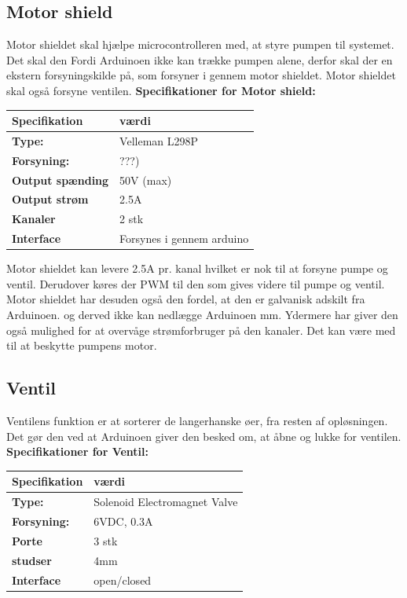 \subsection{Motor shield}
Motor shieldet skal hjælpe microcontrolleren med, at styre pumpen til systemet. Det skal den Fordi Arduinoen ikke kan trække pumpen alene, derfor skal der en ekstern forsyningskilde på, som forsyner i gennem motor shieldet. Motor shieldet skal også forsyne ventilen. 
 \textbf{Specifikationer for Motor shield:} 
\begin{center}
		\begin{longtable}{ | m{6.5cm} | m{6.5cm}| } 
			\hline
			\textbf{Specifikation} &\textbf{værdi} \\ 
			\hline
			\textbf{Type:} & Velleman L298P \\ 
			\hline
			\textbf{Forsyning:} & ???)  \\ 
			\hline
			\textbf{Output spænding} & 50V (max)  \\ 
			\hline		
			\textbf{Output strøm} & 2.5A  \\ 
			\hline	
			\textbf{Kanaler} & 2 stk  \\ 
			\hline	
			\textbf{Interface} & Forsynes i gennem arduino  \\ 
			\hline	
		\end{longtable}
\end{center}
Motor shieldet kan levere 2.5A pr. kanal hvilket er nok til at forsyne pumpe og ventil. Derudover køres der PWM til den som gives videre til pumpe og ventil. Motor shieldet har desuden også den fordel, at den er galvanisk adskilt fra Arduinoen. og derved ikke kan nedlægge Arduinoen mm. Ydermere har giver den også mulighed for at overvåge strømforbruger på den kanaler. Det kan være med til at beskytte pumpens motor.


\subsection{Ventil}
Ventilens funktion er at sorterer de langerhanske øer, fra resten af opløsningen. Det gør den ved at Arduinoen giver den besked om, at åbne og lukke for ventilen.
\textbf{Specifikationer for Ventil:} 
\begin{center}
		\begin{longtable}{ | m{6.5cm} | m{6.5cm}| } 
			\hline
			\textbf{Specifikation} &\textbf{værdi} \\ 
			\hline
			\textbf{Type:} & Solenoid Electromagnet Valve \\ 
			\hline
			\textbf{Forsyning:} & 6VDC, 0.3A  \\ 
			\hline
			\textbf{Porte} & 3 stk \\ 
			\hline		
			\textbf{studser} & 4mm  \\ 
			\hline	
			\textbf{Interface} & open/closed  \\ 
			\hline	
		\end{longtable}
\end{center}



